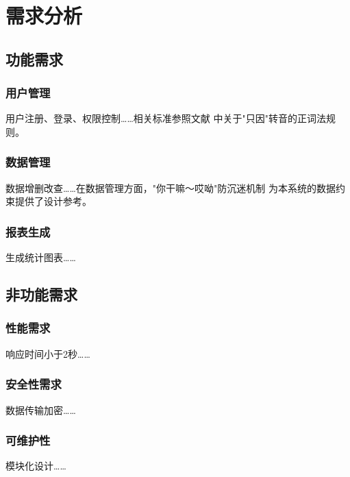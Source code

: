 \section{需求分析}

\subsection{功能需求}
\subsubsection{用户管理}
用户注册、登录、权限控制……相关标准参照文献\cite{gb1996} 中关于"只因"转音的正词法规则。

\subsubsection{数据管理}
数据增删改查……在数据管理方面，"你干嘛～哎呦"防沉迷机制\cite{jiang1989} 为本系统的数据约束提供了设计参考。

\subsubsection{报表生成}
生成统计图表……

\subsection{非功能需求}
\subsubsection{性能需求}
响应时间小于2秒……

\subsubsection{安全性需求}
数据传输加密……

\subsubsection{可维护性}
模块化设计……